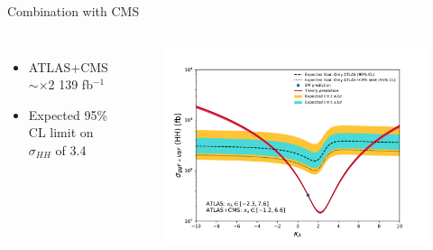 \begin{frame}{Combination with CMS}
\begin{columns}
\begin{itemize}
    \item ATLAS+CMS $\sim \times$2 139 fb$^{-1}$
    \item Expected 95\% CL limit on $\sigma_{HH}$ of 3.4
\end{itemize}
\begin{figure}
    \centering
    \includegraphics[width=1.\textwidth]{BackUp/Part3/Img/kappa_lambda_ATLAS_CMS_stat.pdf}
\end{figure}
\end{columns}
\end{frame}

